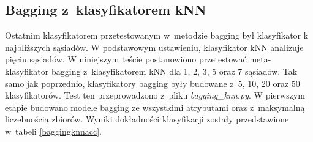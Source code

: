 \subsection{Bagging z~klasyfikatorem kNN}
Ostatnim klasyfikatorem przetestowanym w~metodzie bagging był klasyfikator k najbliższych sąsiadów. W podstawowym ustawieniu, klasyfikator kNN analizuje pięciu sąsiadów. W niniejszym teście postanowiono przetestować meta-klasyfikator bagging z~klasyfikatorem kNN dla 1, 2, 3, 5 oraz 7 sąsiadów. Tak samo jak poprzednio, klasyfikatory bagging były budowane z~5, 10, 20 oraz 50 klasyfikatorów. Test ten przeprowadzono z~pliku \textit{bagging\_knn.py}. W pierwszym etapie budowano modele bagging ze wszystkimi atrybutami oraz z~maksymalną liczebnością zbiorów. Wyniki dokładności klasyfikacji zostały przedstawione w~tabeli \ref{baggingknnacc}. 
\begin{table}[H]
	\tiny
	\begin{center}
\end{center}
\end{table}
